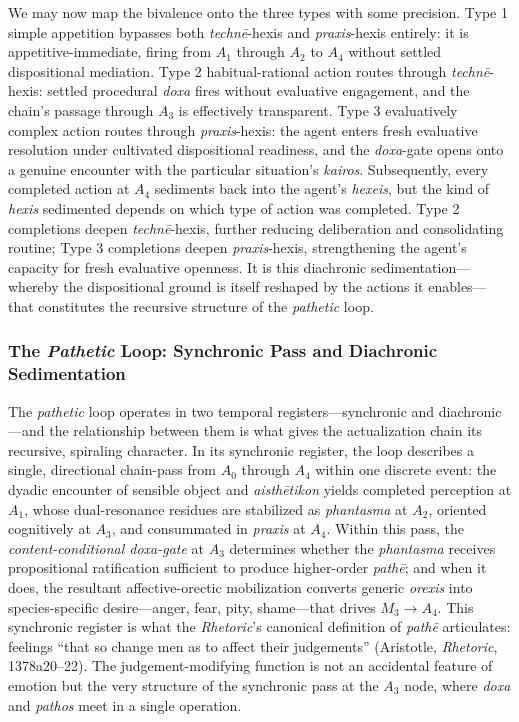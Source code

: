 \documentclass{article}
\begin{document}
We may now map the bivalence onto the three types with some precision. Type 1 simple appetition bypasses both \textit{techn\=e}-hexis and \textit{praxis}-hexis entirely: it is appetitive-immediate, firing from $A_1$ through $A_2$ to $A_4$ without settled dispositional mediation. Type 2 habitual-rational action routes through \textit{techn\=e}-hexis: settled procedural \textit{doxa} fires without evaluative engagement, and the chain's passage through $A_3$ is effectively transparent. Type 3 evaluatively complex action routes through \textit{praxis}-hexis: the agent enters fresh evaluative resolution under cultivated dispositional readiness, and the \textit{doxa}-gate opens onto a genuine encounter with the particular situation's \textit{kairos}. Subsequently, every completed action at $A_4$ sediments back into the agent's \textit{hexeis}, but the kind of \textit{hexis} sedimented depends on which type of action was completed. Type 2 completions deepen \textit{techn\=e}-hexis, further reducing deliberation and consolidating routine; Type 3 completions deepen \textit{praxis}-hexis, strengthening the agent's capacity for fresh evaluative openness. It is this diachronic sedimentation---whereby the dispositional ground is itself reshaped by the actions it enables---that constitutes the recursive structure of the \textit{pathetic} loop.


\subsubsection*{The \textit{Pathetic} Loop: Synchronic Pass and Diachronic Sedimentation}

The \textit{pathetic} loop operates in two temporal registers---synchronic and diachronic---and the relationship between them is what gives the actualization chain its recursive, spiraling character. In its synchronic register, the loop describes a single, directional chain-pass from $A_0$ through $A_4$ within one discrete event: the dyadic encounter of sensible object and \textit{aisth\=etikon} yields completed perception at $A_1$, whose dual-resonance residues are stabilized as \textit{phantasma} at $A_2$, oriented cognitively at $A_3$, and consummated in \textit{praxis} at $A_4$. Within this pass, the \textit{content-conditional doxa-gate} at $A_3$ determines whether the \textit{phantasma} receives propositional ratification sufficient to produce higher-order \textit{path\=e}; and when it does, the resultant affective-orectic mobilization converts generic \textit{orexis} into species-specific desire---anger, fear, pity, shame---that drives $M_3 \rightarrow A_4$. This synchronic register is what the \textit{Rhetoric}'s canonical definition of \textit{path\=e} articulates: feelings ``that so change men as to affect their judgements'' (Aristotle, \textit{Rhetoric}, 1378a20--22). The judgement-modifying function is not an accidental feature of emotion but the very structure of the synchronic pass at the $A_3$ node, where \textit{doxa} and \textit{pathos} meet in a single operation.
\end{document}
